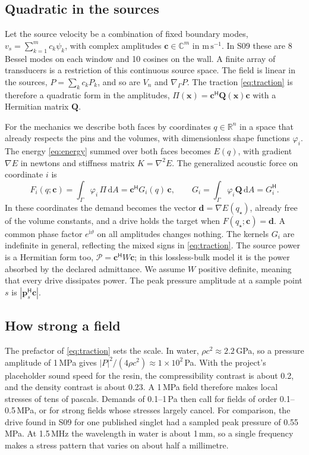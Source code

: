 \documentclass[11pt,a4paper]{article}
\numberwithin{equation}{section}
\newcommand{\dd}{\,\mathrm d}
\newcommand{\R}{\mathbb R}
\newcommand{\C}{\mathbb C}
\newcommand{\Gs}{\nabla_\Gamma}
\begin{document}
\subsection{Quadratic in the sources}
Let the source velocity be a combination of fixed boundary modes,
$v_s=\sum_{k=1}^mc_k\psi_k$, with complex amplitudes $\bm c\in\C^m$ in
$\mathrm{m\,s^{-1}}$. In S09 these are 8 Bessel modes on each window and 10
cosines on the wall. A finite array of transducers is a restriction of this
continuous source space. The field is linear in the sources, $P=\sum_kc_kP_k$,
and so are $V_n$ and $\Gs P$. The traction \cref{eq:traction} is therefore a
quadratic form in the amplitudes, $\Pi(\bm x)=\bm c^{\mathsf H}\bm Q(\bm x)\bm c$
with a Hermitian matrix $\bm Q$.

For the mechanics we describe both faces by coordinates $q\in\R^n$ in a space
that already respects the pins and the volumes, with dimensionless shape
functions $\varphi_i$. The energy \cref{eq:energy} summed over both faces
becomes $E(q)$, with gradient $\nabla E$ in newtons and stiffness matrix
$K=\nabla^2E$. The generalized acoustic force on coordinate $i$ is
\begin{equation}
 F_i(q;\bm c)=\int_\Gamma\varphi_i\,\Pi\dd A=\bm c^{\mathsf H}G_i(q)\,\bm c,
 \qquad G_i=\int_\Gamma\varphi_i\bm Q\dd A=G_i^{\mathsf H}.
 \label{eq:hermitian-force}
\end{equation}
In these coordinates the demand becomes the vector $\bm d=\nabla E(q_\star)$,
already free of the volume constants, and a drive holds the target when
$F(q_\star;\bm c)=\bm d$. A common phase factor $e^{\mathrm i\vartheta}$ on all
amplitudes changes nothing. The kernels $G_i$ are indefinite in general,
reflecting the mixed signs in \cref{eq:traction}. The source power is a
Hermitian form too, $\mathcal P=\bm c^{\mathsf H}W\bm c$; in this
lossless-bulk model it is the power absorbed by the declared admittance. We
assume $W$ positive definite, meaning that every drive dissipates power. The
peak pressure amplitude at a sample point $s$ is $|\bm p_s^{\mathsf H}\bm c|$.

\subsection{How strong a field}
The prefactor of \cref{eq:traction} sets the scale. In water,
$\rho c^2\approx2.2$\,GPa, so a pressure amplitude of 1\,MPa gives
$|P|^2/(4\rho c^2)\approx1\times10^2$\,Pa. With the project's placeholder sound
speed for the resin, the compressibility contrast is about 0.2, and the density
contrast is about 0.23. A 1\,MPa field therefore makes local stresses of tens of
pascals. Demands of 0.1--1\,Pa then call for fields of order 0.1--0.5\,MPa, or
for strong fields whose stresses largely cancel. For comparison, the drive
found in S09 for one published singlet had a sampled peak pressure of
0.55\,MPa. At 1.5\,MHz the wavelength in water is about 1\,mm, so a single
frequency makes a stress pattern that varies on about half a millimetre.
\end{document}

